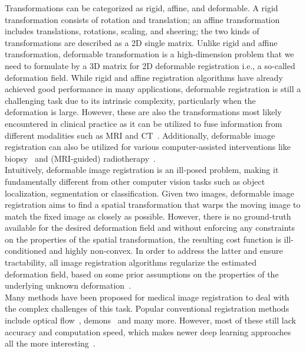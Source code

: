 \documentclass[english,version-2022-01]{uzl-thesis} %
\begin{document}
Transformations can be categorized as rigid, affine, and deformable. A rigid transformation consists of rotation and translation; an affine transformation
includes translations, rotations, scaling, and sheering; the two kinds of transformations are described as a 2D single matrix. Unlike rigid and affine transformation, deformable transformation is a high-dimension problem that we need to formulate by a 3D matrix for 2D deformable registration i.e., a so-called deformation field. While rigid and affine registration algorithms have already achieved good performance in many applications, deformable registration is still a challenging task due to its intrinsic complexity, particularly when the deformation is large. However, these are also the transformations most likely encountered in clinical practice as it can be utilized to fuse information from different modalities such as MRI and CT~\cite{Zou2022}. Additionally, deformable image registration can also be
utilized for various computer-assisted interventions like biopsy~\cite{Tam2016} and (MRI-guided) radiotherapy~\cite{Chen2017, Rigaud2019}. \\
Intuitively, deformable image registration is an ill-posed problem, making it fundamentally different from other computer vision tasks such as object localization, segmentation or classification. Given two images, deformable image registration aims to find a spatial transformation that warps the moving image to match the fixed image as closely as possible. However, there is no ground-truth available for the desired deformation field and without enforcing any constraints on the properties of the spatial transformation, the resulting cost function is ill-conditioned and highly non-convex. In order to address the latter and ensure tractability, all image registration algorithms regularize the estimated deformation field, based on some prior assumptions on the properties of the underlying unknown deformation~\cite{Chen2020}.\\
Many methods have been proposed for medical image registration to deal with the complex challenges of this task. Popular conventional registration methods include optical flow~\cite{Yang2008}, demons~\cite{Vercauteren2009} and many more. However, most of these still lack accuracy and computation speed, which makes newer deep learning approaches all the more interesting~\cite{Fu2020}.
\end{document}

